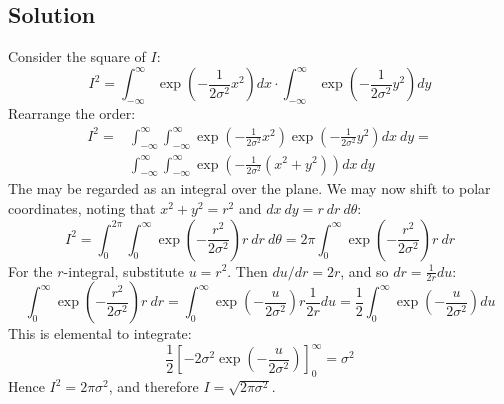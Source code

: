 \documentclass[12pt, a4paper]{article}
\numberwithin{equation}{section}
\begin{document}
\subsection{Solution}
Consider the square of $I$:
\begin{equation}
I^2=\int_{-\infty}^\infty\exp\left(-\frac{1}{2\sigma^2}x^2\right)dx\cdot\int_{-\infty}^\infty\exp\left(-\frac{1}{2\sigma^2}y^2\right)dy
\end{equation}
Rearrange the order:
\begin{align}
I^2=&\int_{-\infty}^\infty\int_{-\infty}^\infty\exp\left(-\frac{1}{2\sigma^2}x^2\right)\exp\left(-\frac{1}{2\sigma^2}y^2\right)dx\ dy=\\
&\int_{-\infty}^\infty\int_{-\infty}^\infty\exp\left(-\frac{1}{2\sigma^2}(x^2+y^2)\right)dx\ dy
\end{align}
The may be regarded as an integral over the plane. We may now shift to polar coordinates, noting that $x^2+y^2=r^2$ and $dx\ dy=r\ dr\ d\theta$:
\begin{equation}
I^2=\int_0^{2\pi}\int_0^\infty\exp\left(-\frac{r^2}{2\sigma^2}\right)r\ dr\ d\theta=2\pi\int_0^\infty\exp\left(-\frac{r^2}{2\sigma^2}\right)r\ dr
\end{equation}
For the $r$-integral, substitute $u=r^2$. Then $du/dr=2r$, and so $dr=\frac{1}{2r}du$:
\begin{equation}
\int_0^\infty\exp\left(-\frac{r^2}{2\sigma^2}\right)r\ dr=\int_0^\infty\exp\left(-\frac{u}{2\sigma^2}\right)r\frac{1}{2r}du=\frac{1}{2}\int_0^\infty\exp\left(-\frac{u}{2\sigma^2}\right)du
\end{equation}
This is elemental to integrate:
\begin{equation}
\frac{1}{2}\left[-2\sigma^2\exp\left(-\frac{u}{2\sigma^2}\right)\right]_0^\infty=\sigma^2
\end{equation}
Hence $I^2=2\pi\sigma^2$, and therefore $I=\sqrt{2\pi\sigma^2}$.
\end{document}

